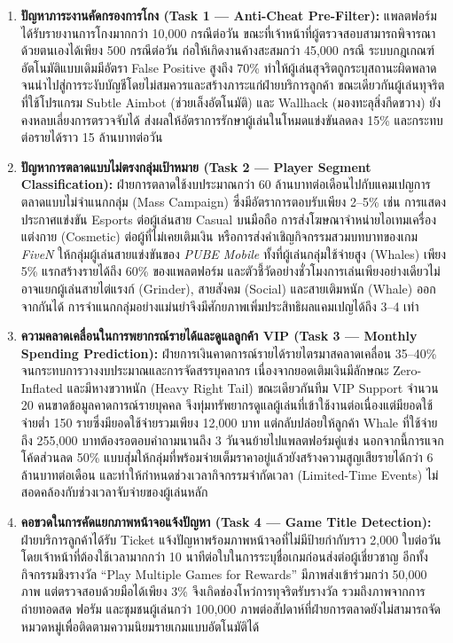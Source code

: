 \documentclass[11pt,a4paper]{article}
\begin{document}
\begin{enumerate}[leftmargin=1.9em,itemsep=2.5pt]
    \item \textbf{ปัญหาภาระงานคัดกรองการโกง (Task 1 — Anti-Cheat Pre-Filter):} แพลตฟอร์มได้รับรายงานการโกงมากกว่า 10,000 กรณีต่อวัน ขณะที่เจ้าหน้าที่ผู้ตรวจสอบสามารถพิจารณาด้วยตนเองได้เพียง 500 กรณีต่อวัน ก่อให้เกิดงานค้างสะสมกว่า 45,000 กรณี ระบบกฎเกณฑ์อัตโนมัติแบบเดิมมีอัตรา False Positive สูงถึง 70\% ทำให้ผู้เล่นสุจริตถูกระบุสถานะผิดพลาดจนนำไปสู่การระงับบัญชีโดยไม่สมควรและสร้างภาระแก่ฝ่ายบริการลูกค้า ขณะเดียวกันผู้เล่นทุจริตที่ใช้โปรแกรม Subtle Aimbot (ช่วยเล็งอัตโนมัติ) และ Wallhack (มองทะลุสิ่งกีดขวาง) ยังคงหลบเลี่ยงการตรวจจับได้ ส่งผลให้อัตราการรักษาผู้เล่นในโหมดแข่งขันลดลง 15\% และกระทบต่อรายได้ราว 15 ล้านบาทต่อวัน
    \item \textbf{ปัญหาการตลาดแบบไม่ตรงกลุ่มเป้าหมาย (Task 2 — Player Segment Classification):} ฝ่ายการตลาดใช้งบประมาณกว่า 60 ล้านบาทต่อเดือนไปกับแคมเปญการตลาดแบบไม่จำแนกกลุ่ม (Mass Campaign) ซึ่งมีอัตราการตอบรับเพียง 2--5\% เช่น การแสดงประกาศแข่งขัน Esports ต่อผู้เล่นสาย Casual บนมือถือ การส่งโฆษณาจำหน่ายไอเทมเครื่องแต่งกาย (Cosmetic) ต่อผู้ที่ไม่เคยเติมเงิน หรือการส่งคำเชิญกิจกรรมสวมบทบาทของเกม \textit{FiveN} ให้กลุ่มผู้เล่นสายแข่งขันของ \textit{PUBE Mobile} ทั้งที่ผู้เล่นกลุ่มใช้จ่ายสูง (Whales) เพียง 5\% แรกสร้างรายได้ถึง 60\% ของแพลตฟอร์ม และตัวชี้วัดอย่างชั่วโมงการเล่นเพียงอย่างเดียวไม่อาจแยกผู้เล่นสายไต่แรงก์ (Grinder), สายสังคม (Social) และสายเติมหนัก (Whale) ออกจากกันได้ การจำแนกกลุ่มอย่างแม่นยำจึงมีศักยภาพเพิ่มประสิทธิผลแคมเปญได้ถึง 3--4 เท่า
    \item \textbf{ความคลาดเคลื่อนในการพยากรณ์รายได้และดูแลลูกค้า VIP (Task 3 — Monthly Spending Prediction):} ฝ่ายการเงินคาดการณ์รายได้รายไตรมาสคลาดเคลื่อน 35--40\% จนกระทบการวางงบประมาณและการจัดสรรบุคลากร เนื่องจากยอดเติมเงินมีลักษณะ Zero-Inflated และมีหางขวาหนัก (Heavy Right Tail) ขณะเดียวกันทีม VIP Support จำนวน 20 คนขาดข้อมูลคาดการณ์รายบุคคล จึงทุ่มทรัพยากรดูแลผู้เล่นที่เข้าใช้งานต่อเนื่องแต่มียอดใช้จ่ายต่ำ 150 รายซึ่งมียอดใช้จ่ายรวมเพียง 12,000 บาท แต่กลับปล่อยให้ลูกค้า Whale ที่ใช้จ่ายถึง 255,000 บาทต้องรอตอบคำถามนานถึง 3 วันจนย้ายไปแพลตฟอร์มคู่แข่ง นอกจากนี้การแจกโค้ดส่วนลด 50\% แบบสุ่มให้กลุ่มที่พร้อมจ่ายเต็มราคาอยู่แล้วยังสร้างความสูญเสียรายได้กว่า 6 ล้านบาทต่อเดือน และทำให้กำหนดช่วงเวลากิจกรรมจำกัดเวลา (Limited-Time Events) ไม่สอดคล้องกับช่วงเวลาจับจ่ายของผู้เล่นหลัก
    \item \textbf{คอขวดในการคัดแยกภาพหน้าจอแจ้งปัญหา (Task 4 — Game Title Detection):} ฝ่ายบริการลูกค้าได้รับ Ticket แจ้งปัญหาพร้อมภาพหน้าจอที่ไม่มีป้ายกำกับราว 2,000 ใบต่อวัน โดยเจ้าหน้าที่ต้องใช้เวลามากกว่า 10 นาทีต่อใบในการระบุชื่อเกมก่อนส่งต่อผู้เชี่ยวชาญ อีกทั้งกิจกรรมชิงรางวัล ``Play Multiple Games for Rewards'' มีภาพส่งเข้าร่วมกว่า 50,000 ภาพ แต่ตรวจสอบด้วยมือได้เพียง 3\% จึงเกิดช่องโหว่การทุจริตรับรางวัล รวมถึงภาพจากการถ่ายทอดสด ฟอรัม และชุมชนผู้เล่นกว่า 100,000 ภาพต่อสัปดาห์ที่ฝ่ายการตลาดยังไม่สามารถจัดหมวดหมู่เพื่อติดตามความนิยมรายเกมแบบอัตโนมัติได้

\end{enumerate}
\end{document}
